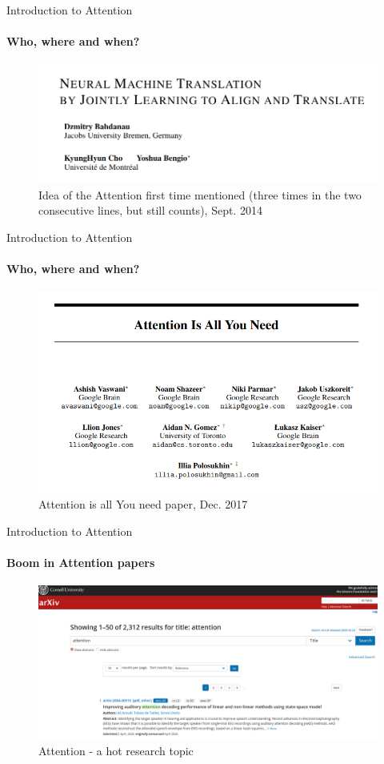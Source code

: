 \documentclass{beamer}
\begin{document}
\begin{frame}{Introduction to Attention}
\framesubtitle{Who, where and when?}

\begin{figure}
    \centering
    \includegraphics[width = .8\textwidth]{images/first-attention.png}
    \caption{Idea of the Attention first time mentioned (three times in the two consecutive lines, but still counts), Sept. 2014\cite{first-paper}}
\end{figure}{}

\end{frame}


\begin{frame}{Introduction to Attention}
\framesubtitle{Who, where and when?}

\begin{figure}
    \centering
    \includegraphics[width = .8\textwidth]{images/attention-is-all-you-need.png}
    \caption{Attention is all You need paper, Dec. 2017\cite{attention-is-all-you-need}}
\end{figure}{}

\end{frame}



\begin{frame}{Introduction to Attention}
\framesubtitle{Boom in Attention papers}

\begin{figure}
    \centering
    \includegraphics[width = .8\textwidth]{images/attention-arxiv.png}
    \caption{Attention - a hot research topic}
\end{figure}{}

\end{frame}
\end{document}
